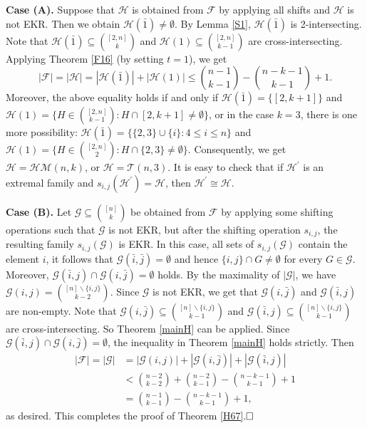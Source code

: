 \documentclass[11pt]{article}
\numberwithin{equation}{section}
\begin{document}
{\bf Case (A).} Suppose that $\mathcal{H}$  is obtained from $\mathcal{F}$ by applying all shifts and  $\mathcal{H}$ is not EKR. 
Then we obtain $\mathcal{H}(\bar{1})\neq \emptyset$.
By Lemma \ref{S1}, $\mathcal{H}(\bar{1})$ is 2-intersecting. Note that $\mathcal{H}(\bar{1}) \subseteq\binom{[2,n]}{k}$ and $\mathcal{H}(1) \subseteq\binom{[2,n]}{k-1}$ are  cross-intersecting. Applying Theorem \ref{F16} (by setting $t=1$), we get
\begin{equation*} \label{eq-HM}
 |\mathcal{F}| = 
|\mathcal{H}|=|\mathcal{H}(\bar{1})|+|\mathcal{H}(1)| \leq\binom{n-1}{k-1}-\binom{n-k-1}{k-1}+1.
\end{equation*}
Moreover, the above equality holds if and only if 
$\mathcal{H}(\bar{1})=\{[2,k+1]\}$ and $\mathcal{H}(1)=\{H\in {[2,n] \choose k-1}:H\cap [2,k+1]\neq \emptyset \}$, 
or in the case $k=3$, there is one more possibility: $\mathcal{H}(\bar{1})=\big\{ \{2,3\}\cup \{i\}: 4\le i\le n \big\}$ and 
$\mathcal{H}(1)=\{H\in {[2,n] \choose 2}: H\cap \{2,3\}\neq \emptyset\}$. Consequently, we get $\mathcal{H}=\mathcal{HM}(n, k)$, or $\mathcal{H}=\mathcal{T}(n, 3)$. 
It is easy to check that if $\mathcal{H}^{\prime}$ is an extremal family and $s_{i,j}(\mathcal{H}^{\prime})=\mathcal{H}$, then $\mathcal{H}^{\prime}\cong \mathcal{H}$.

{\bf Case (B).}
Let $\mathcal{G} \subseteq\binom{[n]}{k}$ be obtained from $\mathcal{F}$ by applying some shifting operations such that $\mathcal{G}$  is not EKR,  but after the shifting operation $s_{i,j}$, the resulting family $s_{i,j}(\mathcal{G})$ is EKR. 
In this case, all sets of $s_{i, j}(\mathcal{G})$  contain the element $i$, 
it follows that $\mathcal{G}(\bar{i},\bar{j})= \emptyset$ and  hence   $\{i,j\}\cap G\neq \emptyset$ for every $G\in \mathcal{G}$.  
Moreover, $\mathcal{G}(\bar{i},j)\cap \mathcal{G}(i,\bar{j})=\emptyset$ holds.
 By the maximality of $|\mathcal{G}|$, we have
$\mathcal{G}(i,j)=\binom{[n]\backslash \{i,j\}}{k-2}$.  Since $\mathcal{G}$ is not EKR, we get that
$\mathcal{G}(i,\bar{j})$ and $\mathcal{G}(\bar{i},j)$ are non-empty.
Note that $\mathcal{G}(i,\bar{j})\subseteq\binom{[n]\backslash \{i,j\}}{k-1}$ and $\mathcal{G}(\bar{i},j)\subseteq\binom{[n]\backslash \{i,j\}}{k-1}$ are cross-intersecting.
So Theorem \ref{mainH} can be applied. 
Since $\mathcal{G}(\bar{i},j)\cap \mathcal{G}(i,\bar{j})=\emptyset$,  the inequality in Theorem \ref{mainH} holds strictly. Then 
\begin{align*}
|\mathcal{F}|=|\mathcal{G}|&=|\mathcal{G}(i,j)|+|\mathcal{G}(i,\bar{j})|+|\mathcal{G}(\bar{i}, j)| \\ 
&< \binom{n-2}{k-2}+\binom{n-2}{k-1}-\binom{n-k-1}{k-1} + 1\\
&=\binom{n-1}{k-1}-\binom{n-k-1}{k-1}+1,
\end{align*}
as desired. This completes the proof of Theorem \ref{H67}.$\hfill \square$
\end{document}
